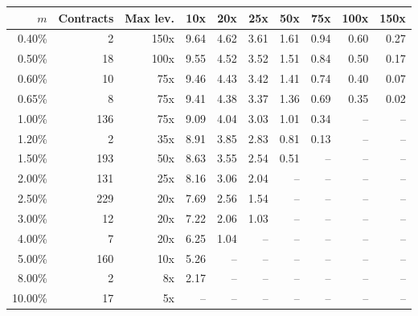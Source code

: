 \begin{tabular}{@{}rrrrrrrrrr@{}}
\toprule
$m$ & Contracts & Max lev. & 10x & 20x & 25x & 50x & 75x & 100x & 150x \\
\midrule
0.40\% & 2 & 150x & 9.64 & 4.62 & 3.61 & 1.61 & 0.94 & 0.60 & 0.27 \\
0.50\% & 18 & 100x & 9.55 & 4.52 & 3.52 & 1.51 & 0.84 & 0.50 & 0.17 \\
0.60\% & 10 & 75x & 9.46 & 4.43 & 3.42 & 1.41 & 0.74 & 0.40 & 0.07 \\
0.65\% & 8 & 75x & 9.41 & 4.38 & 3.37 & 1.36 & 0.69 & 0.35 & 0.02 \\
1.00\% & 136 & 75x & 9.09 & 4.04 & 3.03 & 1.01 & 0.34 & -- & -- \\
1.20\% & 2 & 35x & 8.91 & 3.85 & 2.83 & 0.81 & 0.13 & -- & -- \\
1.50\% & 193 & 50x & 8.63 & 3.55 & 2.54 & 0.51 & -- & -- & -- \\
2.00\% & 131 & 25x & 8.16 & 3.06 & 2.04 & -- & -- & -- & -- \\
2.50\% & 229 & 20x & 7.69 & 2.56 & 1.54 & -- & -- & -- & -- \\
3.00\% & 12 & 20x & 7.22 & 2.06 & 1.03 & -- & -- & -- & -- \\
4.00\% & 7 & 20x & 6.25 & 1.04 & -- & -- & -- & -- & -- \\
5.00\% & 160 & 10x & 5.26 & -- & -- & -- & -- & -- & -- \\
8.00\% & 2 & 8x & 2.17 & -- & -- & -- & -- & -- & -- \\
10.00\% & 17 & 5x & -- & -- & -- & -- & -- & -- & -- \\
\bottomrule
\end{tabular}
